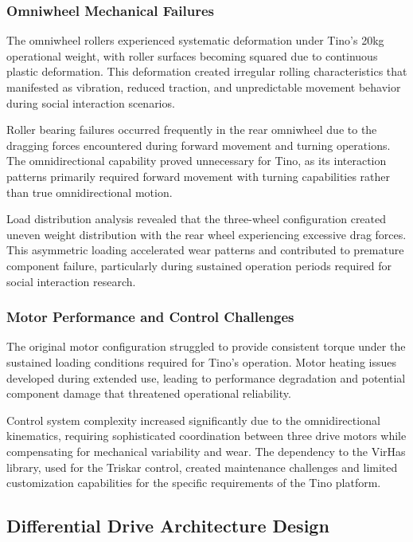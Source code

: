 \subsubsection{Omniwheel Mechanical Failures}

The omniwheel rollers experienced systematic deformation under Tino's 20kg operational weight, with roller surfaces becoming squared due to continuous plastic deformation. This deformation created irregular rolling characteristics that manifested as vibration, reduced traction, and unpredictable movement behavior during social interaction scenarios.

Roller bearing failures occurred frequently in the rear omniwheel due to the dragging forces encountered during forward movement and turning operations. The omnidirectional capability proved unnecessary for Tino, as its interaction patterns primarily required forward movement with turning capabilities rather than true omnidirectional motion.

Load distribution analysis revealed that the three-wheel configuration created uneven weight distribution with the rear wheel experiencing excessive drag forces. This asymmetric loading accelerated wear patterns and contributed to premature component failure, particularly during sustained operation periods required for social interaction research.

\subsubsection{Motor Performance and Control Challenges}

The original motor configuration struggled to provide consistent torque under the sustained loading conditions required for Tino's operation. Motor heating issues developed during extended use, leading to performance degradation and potential component damage that threatened operational reliability.

Control system complexity increased significantly due to the omnidirectional kinematics, requiring sophisticated coordination between three drive motors while compensating for mechanical variability and wear. The dependency to the VirHas library, used for the Triskar control, created maintenance challenges and limited customization capabilities for the specific requirements of the Tino platform.

\subsection{Differential Drive Architecture Design}


